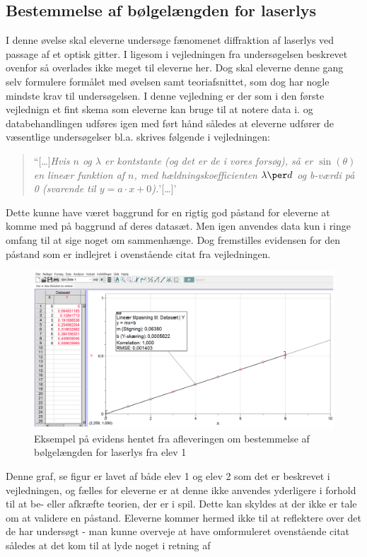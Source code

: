 \subsection*{Bestemmelse af bølgelængden for laserlys}
I denne øvelse skal eleverne undersøge fænomenet diffraktion af laserlys ved passage af et optisk gitter. I ligesom i vejledningen fra undersøgelsen beskrevet ovenfor så overlades ikke meget til eleverne her. Dog skal eleverne denne gang selv formulere formålet med øvelsen  samt teoriafsnittet, som dog har nogle mindste krav til undersøgelsen. I denne vejledning er der som i den første vejlednign et fint skema som eleverne kan bruge til at notere data i. og databehandlingen udføres igen med ført hånd således at eleverne udfører de væsentlige undersøgelser bl.a. skrives følgende i vejledningen:
\begin{quote}
	``[\ldots]\emph{Hvis $n$ og $\lambda$ er kontstante (og det er de i vores forsøg), så er $\sin(\theta)$ en lineær funktion af $n$, med hældningskoefficienten $\lambda\per d$ og b-værdi på 0 (svarende til $y = a\cdot x + 0$).}'[\ldots]'
\end{quote}
Dette kunne have været baggrund for en rigtig god påstand for eleverne at komme med på baggrund af deres datasæt. Men igen anvendes data kun i ringe omfang til at sige noget om sammenhænge. Dog fremstilles evidensen for den påstand som er indlejret i ovenstående citat fra vejledningen. 
\begin{figure}[h!]
	\centering
	\includegraphics[width=\textwidth]{Figs/EviHan}
	\caption[Elev produktion 1]{Eksempel på evidens hentet fra afleveringen om bestemmelse af bølgelængden for laserlys fra elev 1}
	\label{fig:elev1}
\end{figure}
Denne graf, se figur  er lavet af både elev 1 og elev 2 som det er beskrevet i vejledningen, og fælles for eleverne er at denne ikke anvendes yderligere i forhold til at be- eller afkræfte teorien, der er i spil. Dette kan skyldes at der ikke er tale om at validere en påstand. Eleverne kommer hermed ikke til at reflektere over det de har undersøgt - man kunne overveje at have omformuleret ovenstående citat således at det kom til at lyde noget i retning af 
